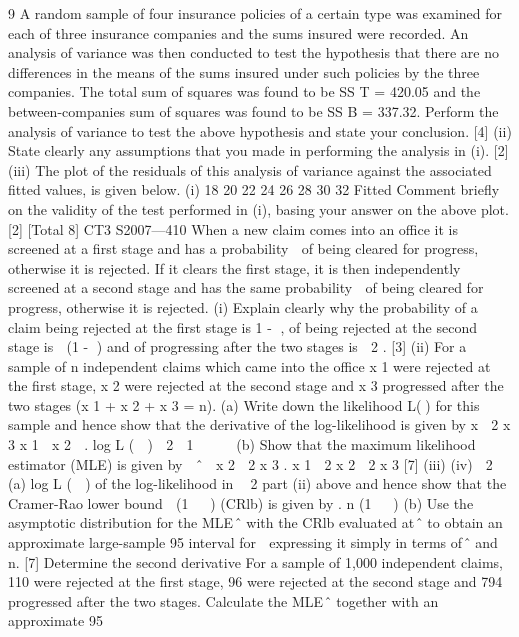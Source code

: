 \documentclass[a4paper,12pt]{article}
\begin{document}
\begin{enumerate}[Total 6]
9
A random sample of four insurance policies of a certain type was examined for each of three insurance companies and the sums insured were recorded. An analysis of variance was then conducted to test the hypothesis that there are no differences in the
means of the sums insured under such policies by the three companies.
The total sum of squares was found to be SS T = 420.05 and the between-companies
sum of squares was found to be SS B = 337.32.
Perform the analysis of variance to test the above hypothesis and state your
conclusion.
[4]
(ii) State clearly any assumptions that you made in performing the analysis in (i).
[2]
(iii) The plot of the residuals of this analysis of variance against the associated
fitted values, is given below.
(i)
18
20
22
24
26
28
30
32
Fitted
Comment briefly on the validity of the test performed in (i), basing your
answer on the above plot.
[2]
[Total 8]
CT3 S2007—410
When a new claim comes into an office it is screened at a first stage and has a probability  of being cleared for progress, otherwise it is rejected. If it clears the first stage, it is then independently screened at a second stage and has the same probability
 of being cleared for progress, otherwise it is rejected.
(i) Explain clearly why the probability of a claim being rejected at the first stage
is 1 - , of being rejected at the second stage is  (1 - ) and of progressing after the two stages is  2 .
[3]
(ii) For a sample of n independent claims which came into the office x 1 were rejected at the first stage, x 2 were rejected at the second stage and x 3
progressed after the two stages (x 1 + x 2 + x 3 = n).
(a)
Write down the likelihood L() for this sample and hence show that the derivative of the log-likelihood is given by
x  2 x 3 x 1  x 2

.
log L (  )  2

1  


(b)
Show that the maximum likelihood estimator (MLE) is given by
 ˆ 
x 2  2 x 3
.
x 1  2 x 2  2 x 3
[7]
(iii)
(iv)

2
(a) log L (  ) of the log-likelihood in
 2
part (ii) above and hence show that the Cramer-Rao lower bound
 (1   )
(CRlb) is given by
.
n (1   )
(b) Use the asymptotic distribution for the MLE ̂ with the CRlb
evaluated at ̂ to obtain an approximate large-sample 95%
interval for  expressing it simply in terms of ̂ and n.
[7]
Determine the second derivative
For a sample of 1,000 independent claims, 110 were rejected at the first stage, 96 were rejected at the second stage and 794 progressed after the two stages.
Calculate the MLE ̂ together with an approximate 95%

\end{enumerate}
\end{document}
